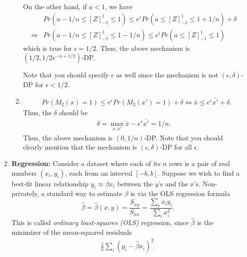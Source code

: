 \documentclass[12pt]{article}
\begin{document}
\begin{enumerate}
\begin{solution}
\begin{enumerate}
    On the other hand, if $a<1$, we have
    \begin{align*}
        &Pr(a-1/n\leq [Z]_{-1}^1\leq 1) \leq e^\epsilon Pr(a\leq [Z]_{-1}^1\leq 1+1/n) + \delta\\
        \Leftrightarrow &  Pr(a-1/n\leq [Z]_{-1}^1\leq 1-1/n) \leq e^\epsilon Pr(a\leq [Z]_{-1}^1\leq 1) 
    \end{align*}
    which is true for $\epsilon = 1/2$.
    Thus, the above mechanism is $(1/2, 1/2 e^{-n+1/2})$-DP.

    Note that you should specify $\epsilon$ as well since the mechanism is not $(\epsilon, \delta)$-DP for $\epsilon<1/2$.

    \item 
    \begin{align*}
        &Pr(M_2(x) = 1) \leq e^\epsilon Pr(M_2(x')=1)+\delta
        \Leftrightarrow \bar{x} \leq e^\epsilon \bar{x'} + \delta.
    \end{align*}
    Thus, the $\delta$ should be
    \begin{align*}
        \delta = \max_{x, x'} \bar{x} - e^\epsilon \bar{x'} = 1/n.
    \end{align*}
    Thus, the above mechanism is $(0, 1/n)$-DP. 
    Note that you should clearly mention that the mechanism is $(\epsilon, \delta)$-DP for all $\epsilon$.
    \end{enumerate}
\end{solution}

\begin{solution}
\vskip .2in
\end{solution}

\item \textbf{Regression: } 
Consider a dataset where each of its $n$ rows is a pair of real numbers $(x_i,y_i)$, each from an interval $[-b,b]$.
Suppose we wish to find a best-fit linear relationship $y_i \approx \beta x_i$ between the $y$'s and the $x$'s.
Non-privately, a standard way to estimate $\beta$ is via the OLS regression formula 
$$\hat{\beta} = \hat{\beta}(x,y) =  \frac{S_{xy}}{S_{xx}}
= \frac{\sum_i x_iy_i}{\sum_i x_i^2}.$$
This is called {\em ordinary least-squares (OLS)} regression, since $\hat{\beta}$ is the minimizer of the mean-squared residuals 
\begin{align*}
    \frac{1}{n} \sum_i (y_i -\hat{\beta} x_i)^2.
\end{align*}


\end{enumerate}
\end{document}
